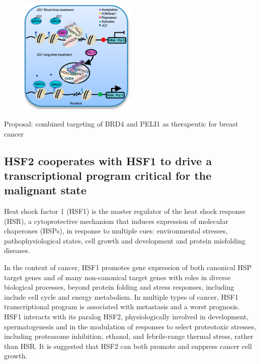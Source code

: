 \begin{figure}
\centering
\includegraphics[width=0.5\textwidth]{../_resources/Screenshot_2022-10-28_at_11-55-04.png}
\caption{}
\end{figure}

Proposal: combined targeting of BRD4 and PELI1 as therapeutic for breast
cancer

\subsection{HSF2 cooperates with HSF1 to drive a transcriptional program critical for the malignant state}

Heat shock factor 1 (HSF1) is the master regulator of the heat shock response (HSR), a cytoprotective mechanism that induces expression of
molecular chaperones (HSPs), in response to multiple cues: environmental stresses, pathophysiological states, cell growth and development and
protein misfolding diseases.

In the context of cancer, HSF1 promotes gene expression of both canonical HSP target genes and of many non-canonical target genes with roles in diverse biological processes, beyond protein folding and stress responses, including include cell cycle and energy metabolism. In multiple types of cancer, HSF1 transcriptional program is associated with metastasis and a worst prognosis. HSF1 interacts with its paralog HSF2, physiologically involved in development, spermatogenesis and in the modulation of responses to select proteotoxic stresses, including proteasome inhibition, ethanol, and febrile-range thermal stress, rather than HSR. It is suggested that HSF2 can both promote and suppress cancer cell growth.

